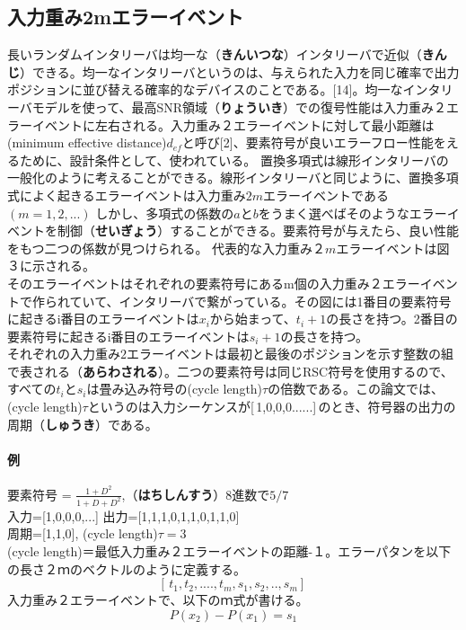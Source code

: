 \documentclass[24 pts]{article}
\begin{document}
\subsection{入力重み2mエラーイベント}
長いランダムインタリーバは均一な（\textbf{きんいつな}）インタリーバで近似（\textbf{きんじ}）できる。均一なインタリーバというのは、与えられた入力を同じ確率で出力ポジションに並び替える確率的なデバイスのことである。[14]。均一なインタリーバモデルを使って、最高SNR領域（\textbf{りょういき}）での復号性能は入力重み２エラーイベントに左右される。入力重み２エラーイベントに対して最小距離は(minimum effective distance)$d_{ef}$と呼び[2]、要素符号が良いエラーフロー性能をえるために、設計条件として、使われている。
置換多項式は線形インタリーバの一般化のように考えることができる。線形インタリーバと同じように、置換多項式によく起きるエラーイベントは入力重み$2m$エラーイベントである $(m=1,2,...)$
しかし、多項式の係数の$a$と$b$をうまく選べばそのようなエラーイベントを制御（\textbf{せいぎょう}）することができる。要素符号が与えたら、良い性能をもつ二つの係数が見つけられる。
代表的な入力重み$２m$エラーイベントは図３に示される。\\
そのエラーイベントはそれぞれの要素符号にあるm個の入力重み２エラーイベントで作られていて、インタリーバで繋がっている。その図には1番目の要素符号に起きるi番目のエラーイベントは$x_i$から始まって、$t_i+1$の長さを持つ。2番目の要素符号に起きるi番目のエラーイベントは$s_i+1$の長さを持つ。\\
それぞれの入力重み$2$エラーイベントは最初と最後のポジションを示す整数の組で表される（\textbf{あらわされる}）。二つの要素符号は同じRSC符号を使用するので、すべての$t_i$と$s_i$は畳み込み符号の(cycle length)$\tau$の倍数である。この論文では、(cycle length)$\tau$というのは入力シーケンスが[\,1,0,0,0......]\,のとき、符号器の出力の周期（\textbf{しゅうき}）である。
\paragraph{例}
要素符号 = $\frac{1+D^2}{1+D+D^2}$,（\textbf{はちしんすう}）$8$進数で$5/7$\\
入力=[1,0,0,0,...] 出力=[1,1,1,0,1,1,0,1,1,0]\\
周期=[1,1,0], (cycle length)$\tau=3$\\
 (cycle length)＝最低入力重み２エラーイベントの距離-１。エラーパタンを以下の長さ２ｍのベクトルのように定義する。
$$[\,t_1, t_2,...., t_m, s_1,s_2,.., s_m]\,$$
入力重み２エラーイベントで、以下のｍ式が書ける。
\begin{equation}\tag{3.1}
P(x_2)-P(x_1)=s_1
\end{equation}
\end{document}
